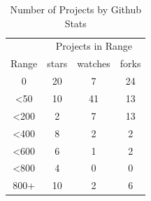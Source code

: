 \documentclass[sigconf]{acmart}
\begin{document}
\begin{table}
  \caption{Number of Projects by Github Stats}
  \label{tab:domain}
\begin{tabular}{ c c c c }
  \toprule
   & \multicolumn{3}{c}{Projects in Range} \\
   \cline{2-4}
  Range & stars & watches & forks\\
  \midrule
  0			&20 & 7& 24\\
  <50		&10 &41& 13\\
  <200	    & 2 & 7& 13\\
  <400	    & 8 & 2&  2\\
  <600   	& 6 & 1&  2\\
  <800      & 4 & 0&  0\\
  800+      & 10& 2&  6\\
  \bottomrule
\end{tabular}
\end{table}
\end{document}
